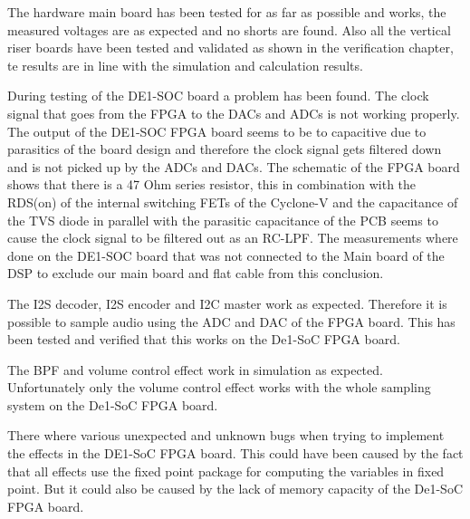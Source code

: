 The hardware main board has been tested for as far as possible and works, the measured voltages are as expected and no shorts are found. Also all the vertical riser boards have been tested and validated as shown in the verification chapter, te results are in line with the simulation and calculation results.

During testing of the DE1-SOC board a problem has been found. The clock signal that goes from the FPGA to the DACs and ADCs is not working properly. The output of the DE1-SOC FPGA board seems to be to capacitive due to parasitics of the board design and therefore the clock signal gets filtered down and is not picked up by the ADCs and DACs. The schematic of the FPGA board shows that there is a 47 Ohm series resistor, this in combination with the RDS(on) of the internal switching FETs of the Cyclone-V and the capacitance of the TVS diode in parallel with the parasitic capacitance of the PCB seems to cause the clock signal to be filtered out as an RC-LPF. The measurements where done on the DE1-SOC board that was not connected to the Main board of the DSP to exclude our main board and flat cable from this conclusion.

The I2S decoder, I2S encoder and I2C master work as expected. Therefore it is possible to
sample audio using the ADC and DAC of the FPGA board. This has been tested and verified
that this works on the De1-SoC FPGA board. 

The BPF and volume control effect work in simulation as expected. Unfortunately only the
volume control effect works with the whole sampling system on the De1-SoC FPGA board.

There where various unexpected and unknown bugs when trying to implement the effects in
the DE1-SoC FPGA board. This could have been caused by the fact that all effects use the fixed
point package for computing the variables in fixed point. But it could also be caused by the lack
of memory capacity of the De1-SoC FPGA board. 

